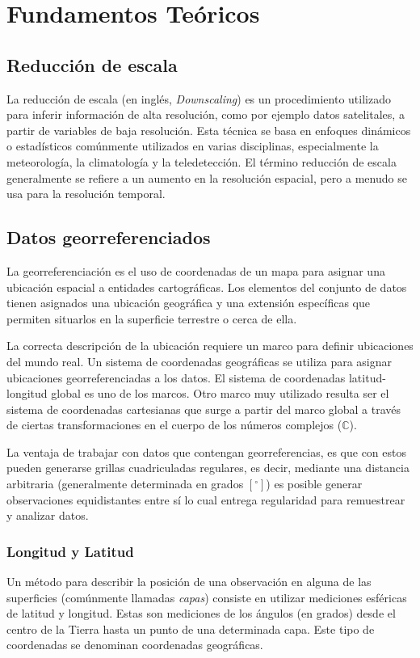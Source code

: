 \chapter{Fundamentos Teóricos}
\label{C2}
\section{Reducción de escala}
La reducción de escala (en inglés, \textit{Downscaling}) es un procedimiento utilizado para inferir 
información de alta resolución, como por ejemplo datos satelitales, a partir de variables de baja 
resolución. Esta técnica se basa en enfoques dinámicos o estadísticos comúnmente utilizados en varias 
disciplinas, especialmente la meteorología, la climatología y la teledetección. El término reducción 
de escala generalmente se refiere a un aumento en la resolución espacial, pero a menudo se usa para la 
resolución temporal.
%
%
%
%
\section{Datos georreferenciados}
La georreferenciación es el uso de coordenadas de un mapa para asignar una ubicación espacial a entidades
cartográficas. Los elementos del conjunto de datos tienen asignados una ubicación geográfica y una extensión específicas
que permiten situarlos en la superficie terrestre o cerca de ella.

La correcta descripción de la ubicación requiere un marco para definir ubicaciones del mundo real. Un sistema de coordenadas geográficas
se utiliza para asignar ubicaciones georreferenciadas a los datos. El sistema de coordenadas latitud-longitud global es uno de los marcos.
Otro marco muy utilizado resulta ser el sistema de coordenadas cartesianas que surge a partir del marco global a través de ciertas transformaciones
en el cuerpo de los números complejos ($\mathbb{C}$).

La ventaja de trabajar con datos que contengan georreferencias, es que con estos pueden generarse grillas cuadriculadas regulares, es decir, mediante una distancia arbitraria (generalmente determinada en grados $[^{\circ}]$)
es posible generar observaciones equidistantes entre sí lo cual entrega regularidad para remuestrear y analizar datos.

    \subsection{Longitud y Latitud}
    Un método para describir la posición de una observación en alguna de las superficies (comúnmente llamadas \textit{capas}) consiste en utilizar 
    mediciones esféricas de latitud y longitud. Estas son mediciones de los ángulos (en grados) desde el centro de la Tierra hasta un punto de una determinada
    capa. Este tipo de coordenadas se denominan coordenadas geográficas.

